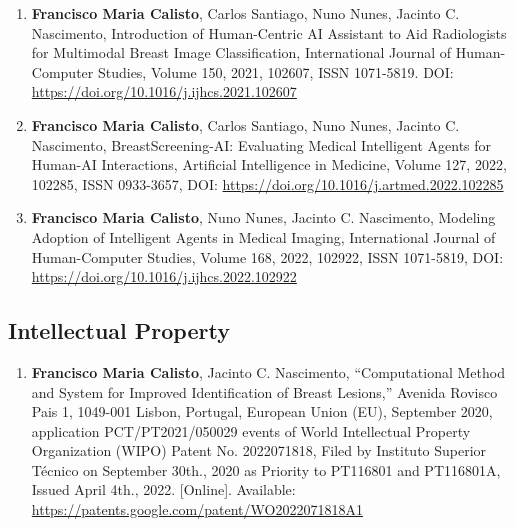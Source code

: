 \begin{enumerate}
\item {\bf Francisco Maria Calisto}, Carlos Santiago, Nuno Nunes, Jacinto C. Nascimento, Introduction of Human-Centric AI Assistant to Aid Radiologists for Multimodal Breast Image Classification, International Journal of Human-Computer Studies, Volume 150, 2021, 102607, ISSN 1071-5819. DOI: \href{https://doi.org/10.1016/j.ijhcs.2021.102607}{https://doi.org/10.1016/j.ijhcs.2021.102607}
\item {\bf Francisco Maria Calisto}, Carlos Santiago, Nuno Nunes, Jacinto C. Nascimento, BreastScreening-AI: Evaluating Medical Intelligent Agents for Human-AI Interactions, Artificial Intelligence in Medicine, Volume 127, 2022, 102285, ISSN 0933-3657, DOI: \href{https://doi.org/10.1016/j.artmed.2022.102285}{https://doi.org/10.1016/j.artmed.2022.102285}
\item {\bf Francisco Maria Calisto}, Nuno Nunes, Jacinto C. Nascimento, Modeling Adoption of Intelligent Agents in Medical Imaging, International Journal of Human-Computer Studies, Volume 168, 2022, 102922, ISSN 1071-5819, DOI: \href{https://doi.org/10.1016/j.ijhcs.2022.102922}{https://doi.org/10.1016/j.ijhcs.2022.102922}
\end{enumerate}

\subsection{Intellectual Property}
\label{sec:sec00100603}

\begin{enumerate}
\item {\bf Francisco Maria Calisto}, Jacinto C. Nascimento, ``Computational Method and System for Improved Identification of Breast Lesions,'' Avenida Rovisco Pais 1, 1049-001 Lisbon, Portugal, European Union (EU), September 2020, application PCT/PT2021/050029 events of World Intellectual Property Organization (WIPO) Patent No. 2022071818, Filed by Instituto Superior T\'{e}cnico on September 30th., 2020 as Priority to PT116801 and PT116801A, Issued April 4th., 2022. [Online]. Available: \href{https://patents.google.com/patent/WO2022071818A1}{https://patents.google.com/patent/WO2022071818A1}
\end{enumerate}